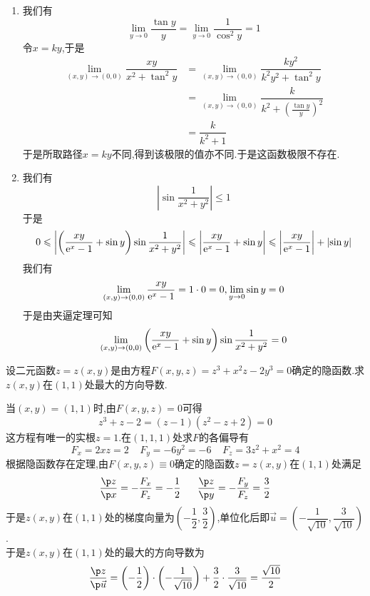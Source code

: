 \documentclass{ctexart}
\begin{document}
\begin{solution}
    \begin{enumerate}[label=\tbf{(\arabic*)}]
        \item 我们有\[\lim_{y\to0}\dfrac{\tan y}{y}=\lim_{y\to0}\dfrac{1}{\cos^2y}=1\]令$x=ky$,于是
            \[\begin{aligned}
                \lim_{(x,y)\to(0,0)}\dfrac{xy}{x^2+\tan^2y}
                &= \lim_{(x,y)\to(0,0)}\dfrac{ky^2}{k^2y^2+\tan^2y} \\
                &= \lim_{(x,y)\to(0,0)}\dfrac{k}{k^2+\left(\frac{\tan y}{y}\right)^2} \\
                &= \dfrac{k}{k^2+1}
            \end{aligned}\]
            于是所取路径$x=ky$不同,得到该极限的值亦不同.于是这函数极限不存在.
        \item 我们有
            \[\left|\sin\dfrac{1}{x^2+y^2}\right|\leqslant 1\]
            于是
            \[0\leqslant\left|\left(\dfrac{xy}{\mathrm{e}^x-1}+\sin y\right)\sin\dfrac{1}{x^2+y^2}\right|\leqslant\left|\dfrac{xy}{\mathrm{e}^x-1}+\sin y\right|\leqslant\left|\dfrac{xy}{\mathrm{e}^x-1}\right|+\left|\sin y\right|\]
            我们有
            \[\lim_{(x,y)\to(0,0)}\dfrac{xy}{\mathrm{e}^x-1}=1\cdot0=0,\lim_{y\to0}\sin y=0\]
            于是由夹逼定理可知
            \[\lim_{(x,y)\to(0,0)}\left(\dfrac{xy}{\mathrm{e}^x-1}+\sin y\right)\sin\dfrac{1}{x^2+y^2}=0\]
    \end{enumerate}
\end{solution}
\begin{problem}[4.(10\songti{分})]
    设二元函数$z=z(x,y)$是由方程$F(x,y,z)=z^3+x^2z-2y^3=0$确定的隐函数.求$z(x,y)$在$(1,1)$处最大的方向导数.
\end{problem}
\begin{solution}
    当$(x,y)=(1,1)$时,由$F(x,y,z)=0$可得
    \[z^3+z-2=(z-1)(z^2-z+2)=0\]
    这方程有唯一的实根$z=1$.在$(1,1,1)$处求$F$的各偏导有
    \[F_x=2xz=2\ \ \ \ \ F_y=-6y^2=-6\ \ \ \ \ F_z=3z^2+x^2=4\]
    根据隐函数存在定理,由$F(x,y,z)\equiv0$确定的隐函数$z=z(x,y)$在$(1,1)$处满足
    \[\dfrac{\p z}{\p x}=-\dfrac{F_x}{F_z}=-\dfrac12\ \ \ \ \ \dfrac{\p z}{\p y}=-\dfrac{F_y}{F_z}=\dfrac32\]
    于是$z(x,y)$在$(1,1)$处的梯度向量为$\left(-\dfrac12,\dfrac32\right)$,单位化后即$\vec{u}=\left(-\dfrac{1}{\sqrt{10}},\dfrac{3}{\sqrt{10}}\right)$.\\
    于是$z(x,y)$在$(1,1)$处的最大的方向导数为
    \[\dfrac{\p z}{\p \vec{u}}=\left(-\dfrac12\right)\cdot\left(-\dfrac{1}{\sqrt{10}}\right)+\dfrac{3}{2}\cdot\dfrac{3}{\sqrt{10}}=\dfrac{\sqrt{10}}{2}\]
\end{solution}
\end{document}
